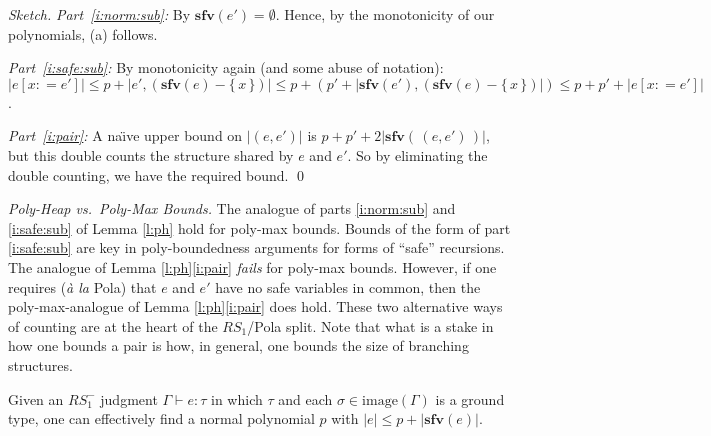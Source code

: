 \documentclass[envcountsame]{llncs}
\newcommand{\sfv}{\ensuremath{\mathbf{sfv}}}\newcommand{\ssize}[1]{\Vert #1\Vert}
\newcommand{\asize}[1]{\ensuremath{\mathopen{|}#1\mathclose{|}}\xspace}
\newcommand{\RSi}{\mathit{RS_1}}
\newcommand{\RSmi}{\mathit{RS^-_1}}
\renewcommand{\gets}{\ensuremath{\mathrel{\colon=}}\xspace}
\newcommand{\image}{\mathrm{image}}
\newcommand{\set}[1]{\{\,#1\,\}}
\newcommand{\entails}{\vdash}
\newcommand{\of}{\colon}
\renewcommand{\colon}{\mathpunct{:}}
\begin{document}
\begin{proof}[Sketch]
\emph{Part~\eqref{i:norm:sub}:} By $\sfv(e')=\emptyset$. 
Hence, by the monotonicity of our polynomials, (a) follows.


\emph{Part~\eqref{i:safe:sub}:}
By monotonicity again 
(and some  abuse of notation):
$\asize{e[x\gets e']} \leq
p + \asize{e',(\sfv(e)-\set{x})}
\leq p+ (p'+\asize{\sfv(e'),(\sfv(e)-\set{x})})
\leq p+p'+\asize{e[x\gets e']}$.

\emph{Part~\eqref{i:pair}:}
A na\"{\i}ve upper bound on $\asize{(e,e')}$ is 
$p+p'+2\asize{\sfv(\,(e,e')\,)}$, but this double counts the
structure shared by $e$ and $e'$. 
So by eliminating the double counting, 
we have the required bound. 
\qed
\end{proof}

\emph{Poly-Heap vs.~Poly-Max Bounds.}
The analogue of parts \eqref{i:norm:sub} and \eqref{i:safe:sub} 
of Lemma \ref{l:ph} hold for poly-max bounds. 
Bounds of the form of part \eqref{i:safe:sub} are key in 
poly-boundedness arguments for forms of ``safe'' recursions. 
The analogue of Lemma \ref{l:ph}\eqref{i:pair} \emph{fails}
for poly-max bounds.  However, if one requires (\emph{\`a la} Pola)
that $e$ and $e'$ have no safe variables in common, then 
the poly-max-analogue of Lemma \ref{l:ph}\eqref{i:pair} 
does hold.
These two alternative ways of counting are at the heart of 
the $\RSi$/Pola  split.  Note that what is a stake in how one
bounds a pair is how, in general, one bounds the size of 
branching structures.








\begin{theorem} 
Given an $\RSmi$ judgment $\Gamma\entails e\of \tau$  in which
  $\tau$ and each $\sigma\in\image(\Gamma)$ is a ground type, one can
  effectively find a normal polynomial $p$ with
  $\asize{e} \leq p + \asize{\sfv(e)}$.
\end{theorem}
\end{document}
